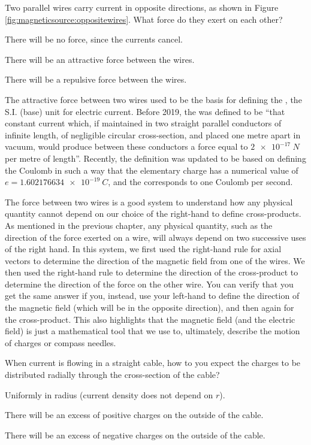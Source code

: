 \begin{checkpoint}{}
	\begin{MCquestion}{Two parallel wires carry current in opposite directions, as shown in Figure \ref{fig:magneticsource:oppositewires}. What force do they exert on each other?}
		\item There will be no force, since the currents cancel.
		\item There will be an attractive force between the wires.
		\item There will be a repulsive force between the wires. \correct
	\end{MCquestion}
\end{checkpoint}
The attractive force between two wires used to be the basis for defining the \ampere, the S.I. (base) unit for electric current. Before 2019, the \amperesp was defined to be ``that constant current which, if maintained in two straight parallel conductors of infinite length, of negligible circular cross-section, and placed one metre apart in vacuum, would produce between these conductors a force equal to $\SI{2e-17}{N}$ per metre of length''. Recently, the definition was updated to be based on defining the Coulomb in such a way that the elementary charge has a numerical value of $e=\SI{1.602176634e-19}{C}$, and the \amperesp corresponds to one Coulomb per second.

The force between two wires is a good system to understand how any physical quantity cannot depend on our choice of the right-hand to define cross-products. As mentioned in the previous chapter, any physical quantity, such as the direction of the force exerted on a wire, will always depend on two successive uses of the right hand. In this system, we first used the right-hand rule for axial vectors to determine the direction of the magnetic field from one of the wires. We then used the right-hand rule to determine the direction of the cross-product to determine the direction of the force on the other wire. You can verify that you get the same answer if you, instead, use your left-hand to define the direction of the magnetic field (which will be in the opposite direction), and then again for the cross-product. This also highlights that the magnetic field (and the electric field) is just a mathematical tool that we use to, ultimately, describe the motion of charges or compass needles.
\begin{checkpoint}{}
	\begin{MCquestion}{When current is flowing in a straight cable, how to you expect the charges to be distributed radially through the cross-section of the cable?}
		\item Uniformly in radius (current density does not depend on $r$).
		\item There will be an excess of positive charges on the outside of the cable. \correct
		\item There will be an excess of negative charges on the outside of the cable.
	\end{MCquestion}
\end{checkpoint}
